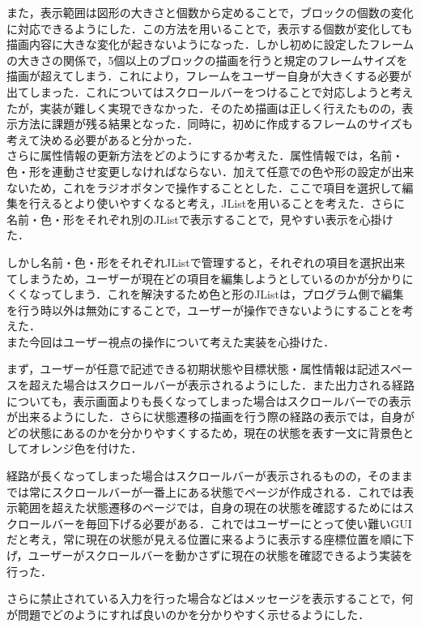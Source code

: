 \documentclass[uplatex,12pt]{jsarticle}
\begin{document}
また，表示範囲は図形の大きさと個数から定めることで，ブロックの個数の変化に対応できるようにした．この方法を用いることで，表示する個数が変化しても描画内容に大きな変化が起きないようになった．しかし初めに設定したフレームの大きさの関係で，5個以上のブロックの描画を行うと規定のフレームサイズを描画が超えてしまう．これにより，フレームをユーザー自身が大きくする必要が出てしまった．これについてはスクロールバーをつけることで対応しようと考えたが，実装が難しく実現できなかった．そのため描画は正しく行えたものの，表示方法に課題が残る結果となった．同時に，初めに作成するフレームのサイズも考えて決める必要があると分かった．\\

さらに属性情報の更新方法をどのようにするか考えた．属性情報では，名前・色・形を連動させ変更しなければならない．加えて任意での色や形の設定が出来ないため，これをラジオボタンで操作することとした．ここで項目を選択して編集を行えるとより使いやすくなると考え，JListを用いることを考えた．さらに名前・色・形をそれぞれ別のJListで表示することで，見やすい表示を心掛けた．\par
しかし名前・色・形をそれぞれJListで管理すると，それぞれの項目を選択出来てしまうため，ユーザーが現在どの項目を編集しようとしているのかが分かりにくくなってしまう．これを解決するため色と形のJListは，プログラム側で編集を行う時以外は無効にすることで，ユーザーが操作できないようにすることを考えた．\\

また今回はユーザー視点の操作について考えた実装を心掛けた．\par
まず，ユーザーが任意で記述できる初期状態や目標状態・属性情報は記述スペースを超えた場合はスクロールバーが表示されるようにした．また出力される経路についても，表示画面よりも長くなってしまった場合はスクロールバーでの表示が出来るようにした．さらに状態遷移の描画を行う際の経路の表示では，自身がどの状態にあるのかを分かりやすくするため，現在の状態を表す一文に背景色としてオレンジ色を付けた．\par
経路が長くなってしまった場合はスクロールバーが表示されるものの，そのままでは常にスクロールバーが一番上にある状態でページが作成される．これでは表示範囲を超えた状態遷移のページでは，自身の現在の状態を確認するためにはスクロールバーを毎回下げる必要がある．これではユーザーにとって使い難いGUIだと考え，常に現在の状態が見える位置に来るように表示する座標位置を順に下げ，ユーザーがスクロールバーを動かさずに現在の状態を確認できるよう実装を行った．\par
さらに禁止されている入力を行った場合などはメッセージを表示することで，何が問題でどのようにすれば良いのかを分かりやすく示せるようにした． \\
\end{document}
